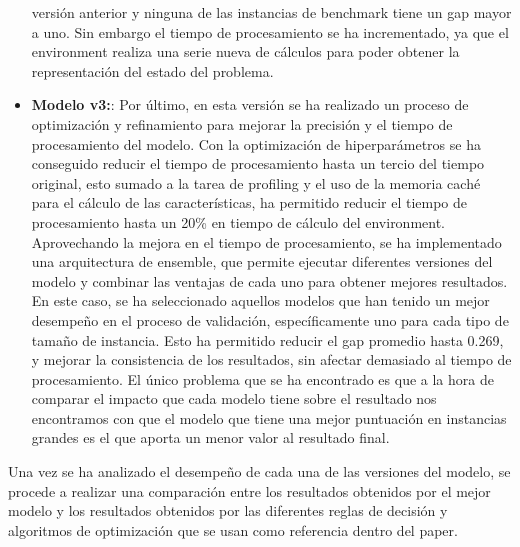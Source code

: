 \begin{itemize}
        versión anterior y ninguna de las instancias de benchmark tiene un gap mayor
        a uno. Sin embargo el tiempo de procesamiento se ha incrementado, ya que el
        environment realiza una serie nueva de cálculos para poder obtener la
        representación del estado del problema.
    \item \textbf{Modelo v3:}: Por último, en esta versión se ha
        realizado un proceso de optimización y refinamiento para
        mejorar la precisión y el tiempo de procesamiento del modelo. 
        Con la optimización de hiperparámetros se ha conseguido reducir
        el tiempo de procesamiento hasta un tercio del tiempo original, esto
        sumado a la tarea de profiling y el uso de la memoria caché para el
        cálculo de las características, ha permitido reducir el tiempo de procesamiento
        hasta un 20\% en tiempo de cálculo del environment. Aprovechando la mejora
        en el tiempo de procesamiento, se ha implementado una arquitectura de
        ensemble, que permite ejecutar diferentes versiones del modelo y combinar
        las ventajas de cada uno para obtener mejores resultados. En este caso, se
        ha seleccionado aquellos modelos que han tenido un mejor desempeño en el
        proceso de validación, específicamente uno para cada tipo de tamaño de
        instancia. Esto ha permitido reducir el gap promedio hasta 0.269, y
        mejorar la consistencia de los resultados, sin afectar demasiado al
        tiempo de procesamiento. El único problema que se ha encontrado es que
        a la hora de comparar el impacto que cada modelo tiene sobre el resultado
        nos encontramos con que el modelo que tiene una mejor puntuación en 
        instancias grandes es el que aporta un menor valor al resultado final.
\end{itemize}

Una vez se ha analizado el desempeño de cada una de las versiones del modelo,
se procede a realizar una comparación entre los resultados obtenidos por el
mejor modelo y los resultados obtenidos por las diferentes reglas de decisión
y algoritmos de optimización que se usan como referencia dentro del 
paper\cite{pbrandimarte}.

